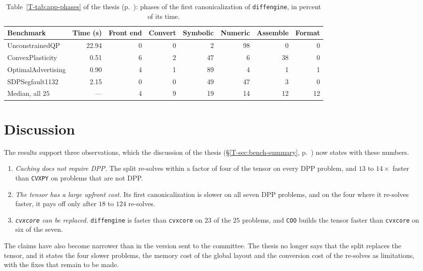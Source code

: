 \documentclass[letterpaper,12pt]{article}
\newcommand{\ac}[1]{#1}
\newcommand{\tsec}[1]{\S\ref{T-#1}}
\newcommand{\tpage}[1]{p.~\pageref{T-#1}}
\newcommand{\tref}[1]{\tsec{#1}, \tpage{#1}}
\begin{document}
\begin{table}[htbp]
\centering
\caption{Table~\ref{T-tab:app-phases} of the thesis (\tpage{tab:app-phases}): phases of the
first canonicalization of \texttt{diffengine}, in percent of its time.}\label{tab:res-phases}
{\small
\setlength{\tabcolsep}{4pt}
\begin{tabular}{l r rrrrrr}
\toprule
Benchmark & Time (s) & Front end & Convert & Symbolic & Numeric & Assemble & Format \\
\midrule
UnconstrainedQP      & 22.94 & 0 & 0 & 2 & 98 & 0 & 0 \\
ConvexPlasticity     & 0.51 & 6 & 2 & 47 & 6 & 38 & 0 \\
OptimalAdvertising   & 0.90 & 4 & 1 & 89 & 4 & 1 & 1 \\
SDPSegfault1132      & 2.15 & 0 & 0 & 49 & 47 & 3 & 0 \\
\midrule
Median, all $25$   & ---  & 4 & 9 & 19 & 14 & 12 & 12 \\
\bottomrule
\end{tabular}}
\end{table}

\section{Discussion}\label{sec:discussion}
The results support three observations, which the discussion of the thesis
(\tref{sec:bench-summary}) now states with these numbers.
\begin{enumerate}[leftmargin=*]
\item \emph{Caching does not require \ac{DPP}.} The split re-solves within a factor of four of
the tensor on every \ac{DPP} problem, and $13$ to $14\times$ faster than \texttt{CVXPY} on problems that
are not \ac{DPP}.
\item \emph{The tensor has a large upfront cost.} Its first canonicalization is slower on all
seven \ac{DPP} problems, and on the four where it re-solves faster, it pays off only after $18$
to $124$ re-solves.
\item \emph{\texttt{cvxcore} can be replaced.} \texttt{diffengine} is faster than
\texttt{cvxcore} on $23$ of the $25$ problems, and \texttt{COO} builds the tensor faster than
\texttt{cvxcore} on six of the seven.
\end{enumerate}
The claims have also become narrower than in the version sent to the committee. The thesis no
longer says that the split replaces the tensor, and it states the four slower problems, the
memory cost of the global layout and the conversion cost of the re-solves as limitations, with
the fixes that remain to be made.



\end{document}
